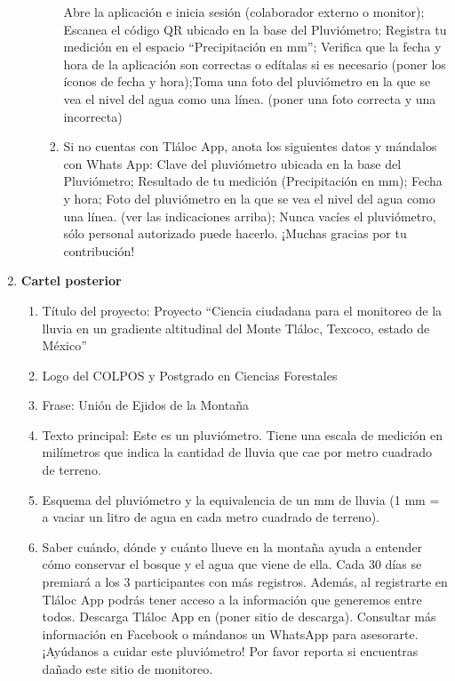 \begin{enumerate}
\begin{enumerate}
\begin{enumerate}
            Abre la aplicación e inicia sesión (colaborador externo o monitor); Escanea el código QR ubicado en la base del Pluviómetro; Registra tu medición en el espacio “Precipitación en mm”; Verifica que la fecha  y hora de la aplicación son correctas o edítalas si es necesario (poner los íconos de fecha y hora);Toma una foto del pluviómetro en la que se vea el nivel del agua como una línea. (poner una foto correcta y una incorrecta)            
            \item 	Si no cuentas con Tláloc App, anota los siguientes datos y mándalos con Whats App: Clave del pluviómetro ubicada en la base del Pluviómetro; Resultado de tu medición (Precipitación en mm); Fecha y hora; Foto del pluviómetro en la que se vea el nivel del agua como una línea. (ver las indicaciones arriba); Nunca vacíes el pluviómetro, sólo personal autorizado puede hacerlo. ¡Muchas gracias por tu contribución!            
        \end{enumerate}
    \end{enumerate}
    \item \textbf{Cartel posterior} \begin{enumerate}
        \item Título del proyecto: Proyecto “Ciencia ciudadana para el monitoreo de la lluvia en un gradiente altitudinal del Monte Tláloc, Texcoco, estado de México”
        \item Logo del COLPOS y Postgrado en Ciencias Forestales
        \item Frase: Unión de Ejidos de la Montaña
        \item Texto principal: Este es un pluviómetro. Tiene una escala de medición en milímetros que indica la cantidad de lluvia que cae por metro cuadrado de terreno.
        \item Esquema del pluviómetro y la equivalencia de un mm de lluvia (1 mm = a vaciar un litro de agua en cada metro cuadrado de terreno).
        \item Saber cuándo, dónde y cuánto llueve en la montaña ayuda a entender cómo conservar el bosque y el agua que viene de ella. Cada 30 días se premiará a los 3 participantes con más registros. Además, al registrarte en Tláloc App podrás tener acceso a la información que generemos entre todos. Descarga Tláloc App en (poner sitio de descarga). Consultar más información en Facebook o mándanos un WhatsApp para asesorarte. ¡Ayúdanos a cuidar este pluviómetro! Por favor reporta si encuentras dañado este sitio de monitoreo.
    \end{enumerate}
\end{enumerate}
